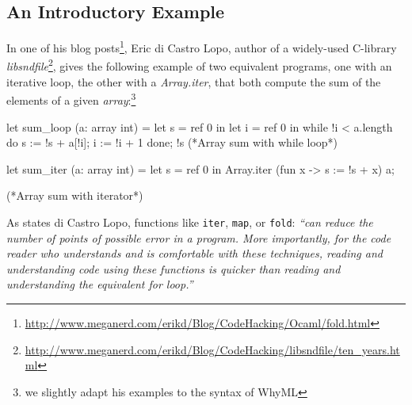 \documentclass[a4paper,11pt,oneside]{article}
\theoremstyle{plain}
\newcommand{\meganerd}	
	{\url{http://www.meganerd.com/erikd/Blog/CodeHacking/Ocaml/fold.html}}
\newcommand{\libsndfile}
{\url{
http://www.meganerd.com/erikd/Blog/CodeHacking/libsndfile/ten_years.html}}
\begin{document}
	
	
	
\subsection*{An Introductory Example}		

	
	
	In one of his blog posts\footnote{\meganerd}, Eric di Castro Lopo, author of a widely-used C-library \textit{libsndfile}\footnote{\libsndfile}, gives the following example of two equivalent programs, one with an iterative loop, the other with a \textit{Array.iter}, that both compute the sum of the elements of a given \textit{array}:\vspace{-0.5cm}\footnote{we slightly adapt his examples to the syntax of WhyML} 

\begin{small}
	\begin{minipage}[t]{0.4\linewidth}
		\begin{whycode}  
 let sum_loop (a: array int) =		
  let s = ref 0 in
  let i = ref 0 in
  while !i < a.length do
    s := !s + a[!i];
    i := !i + 1
  done; !s 
 (*Array sum with while loop*)
		\end{whycode}
	\end{minipage}\hfill 
	\begin{minipage}[t]{0.51\linewidth}
		\begin{whycode} 
  let sum_iter (a: array int) =		 
    let s = ref 0 in
    Array.iter (fun x -> s := !s + x) a;



 
    (*Array sum with iterator*)
		\end{whycode}	
	\end{minipage}
\end{small}

	As states di Castro Lopo, functions like \texttt{iter}, \texttt{map}, or \texttt{fold}: \textit{``can reduce the number of points of possible error in a program. 
	More importantly, for the code reader who understands and is comfortable with these techniques, reading and understanding code using these functions is quicker than reading and understanding the equivalent for loop.''}
			
\end{document}
